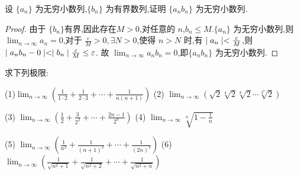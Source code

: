 \begin{practice}
    设 $\{a_n\}$ 为无穷小数列,$\{b_n\}$ 为有界数列,证明 $\{a_nb_n\}$ 为无穷小数列.
\end{practice}

\begin{proof}
    由于 $\{b_n\}$有界,因此存在$M>0$,对任意的 $n$,$b_n\le M$.$\{a_n\}$ 为无穷小数列,则 $\lim_{n\to\infty} a_n=0$,对于 $\frac{\varepsilon}{M}>0,\exists N>0$,使得 $ n>N$ 时,有 $\mid a_n \mid<\frac{\varepsilon}{M}$,则 $\mid a_nb_n-0 \mid<\mid b_n \mid\frac{\varepsilon}{M}\le \varepsilon$. 故 $\lim_{n\to\infty} a_nb_n=0$,即$\{a_nb_n\}$ 为无穷小数列.
\end{proof}

\begin{practice}
    求下列极限:

    (1)$\lim_{n\to\infty} (\frac{1}{1\cdot 2}+\frac{1}{2\cdot 3}+\cdots+\frac{1}{n(n+1)})$ \qquad (2) $\lim_{n\to\infty} (\sqrt{2}\sqrt[4]{2}\sqrt[8]{2}\cdots \sqrt[2^n]{2})$

    (3) $\lim_{n\to\infty} (\frac{1}{2}+\frac{3}{2^2}+\cdots+\frac{2n-1}{2^n})$ \qquad (4) $\lim_{n\to\infty} \sqrt[n]{1-\frac{1}{n}}$

    (5) $\lim_{n\to\infty} (\frac{1}{n^2}+\frac{1}{(n+1)^2}+\cdots+\frac{1}{(2n)^2})$ \qquad (6) $\lim_{n\to\infty} (\frac{1}{\sqrt{n^2+1}}+\frac{1}{\sqrt{n^2+2}}+\cdots+\frac{1}{\sqrt{n^2+n}})$ 
\end{practice}

